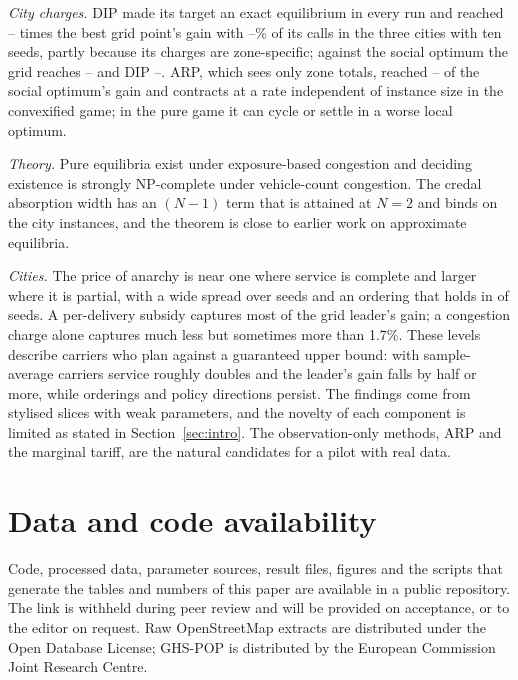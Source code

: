 \documentclass[preprint,12pt]{elsarticle}
\theoremstyle{definition}
\theoremstyle{remark}
\begin{document}
\emph{City charges.} DIP made its target an exact equilibrium in every run and reached \TenDipGridBuenosAires--\TenDipGridNewDelhi{} times the best grid point's gain with \TenDipCallsNewDelhi--\TenDipCallsLondon\% of its calls in the three cities with ten seeds, partly because its charges are zone-specific; against the social optimum the grid reaches \TenSoGridNewDelhi--\TenSoGridBuenosAires{} and DIP \TenSoDipNewDelhi--\TenSoDipLondon. ARP, which sees only zone totals, reached \TenSoArpNewDelhi--\TenSoArpBuenosAires{} of the social optimum's gain and contracts at a rate independent of instance size in the convexified game; in the pure game it can cycle or settle in a worse local optimum.

\emph{Theory.} Pure equilibria exist under exposure-based congestion and deciding existence is strongly NP-complete under vehicle-count congestion. The credal absorption width has an $(N-1)$ term that is attained at $N=2$ and binds on the city instances, and the theorem is close to earlier work on approximate equilibria.

\emph{Cities.} The price of anarchy is near one where service is complete and larger where it is partial, with a wide spread over seeds and an ordering that holds in \TenPoaOrderAll{} of \TenPoaOrderN{} seeds. A per-delivery subsidy captures most of the grid leader's gain; a congestion charge alone captures much less but sometimes more than 1.7\%. These levels describe carriers who plan against a guaranteed upper bound: with sample-average carriers service roughly doubles and the leader's gain falls by half or more, while orderings and policy directions persist. The findings come from stylised slices with weak parameters, and the novelty of each component is limited as stated in Section~\ref{sec:intro}. The observation-only methods, ARP and the marginal tariff, are the natural candidates for a pilot with real data.

\section*{Data and code availability}
Code, processed data, parameter sources, result files, figures and the scripts that generate the tables and numbers of this paper are available in a public repository. The link is withheld during peer review and will be provided on acceptance, or to the editor on request. Raw OpenStreetMap extracts are distributed under the Open Database License; GHS-POP is distributed by the European Commission Joint Research Centre.
\end{document}
